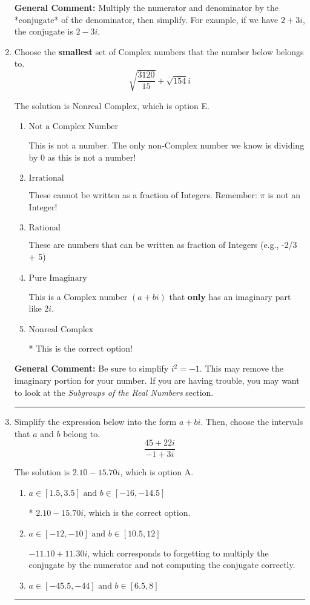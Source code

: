 \documentclass{extbook}[14pt]
\newcommand{\litem}[1]{\item #1

\rule{\textwidth}{0.4pt}}
\begin{document}
\begin{enumerate}
{\textbf{General Comment:} Multiply the numerator and denominator by the *conjugate* of the denominator, then simplify. For example, if we have $2+3i$, the conjugate is $2-3i$.
}
\litem{
Choose the \textbf{smallest} set of Complex numbers that the number below belongs to.
\[ \sqrt{\frac{3120}{15}}+\sqrt{154} i \]

The solution is \( \text{Nonreal Complex} \), which is option E.\begin{enumerate}[label=\Alph*.]
\item \( \text{Not a Complex Number} \)

This is not a number. The only non-Complex number we know is dividing by 0 as this is not a number!
\item \( \text{Irrational} \)

These cannot be written as a fraction of Integers. Remember: $\pi$ is not an Integer!
\item \( \text{Rational} \)

These are numbers that can be written as fraction of Integers (e.g., -2/3 + 5)
\item \( \text{Pure Imaginary} \)

This is a Complex number $(a+bi)$ that \textbf{only} has an imaginary part like $2i$.
\item \( \text{Nonreal Complex} \)

* This is the correct option!
\end{enumerate}

\textbf{General Comment:} Be sure to simplify $i^2 = -1$. This may remove the imaginary portion for your number. If you are having trouble, you may want to look at the \textit{Subgroups of the Real Numbers} section.
}
\litem{
Simplify the expression below into the form $a+bi$. Then, choose the intervals that $a$ and $b$ belong to.
\[ \frac{45 + 22 i}{-1 + 3 i} \]

The solution is \( 2.10  - 15.70 i \), which is option A.\begin{enumerate}[label=\Alph*.]
\item \( a \in [1.5, 3.5] \text{ and } b \in [-16, -14.5] \)

* $2.10  - 15.70 i$, which is the correct option.
\item \( a \in [-12, -10] \text{ and } b \in [10.5, 12] \)

 $-11.10  + 11.30 i$, which corresponds to forgetting to multiply the conjugate by the numerator and not computing the conjugate correctly.
\item \( a \in [-45.5, -44] \text{ and } b \in [6.5, 8] \)


\end{enumerate}}
\end{enumerate}
\end{document}
